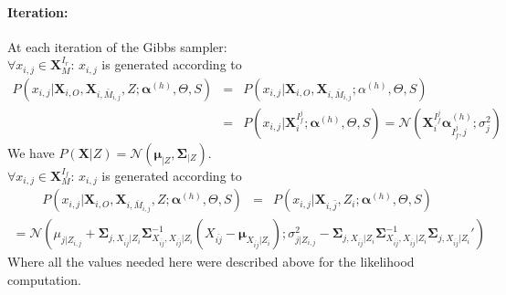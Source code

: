 \documentclass[12pt,a4paper]{report}
\begin{document}
		\paragraph{Iteration:} At each iteration of the Gibbs sampler: \\
			$\forall x_{i,j} \in \boldsymbol{X}_M^{I_r}$:  $x_{i,j}$ is generated according to 
			\begin{eqnarray}
			P(x_{i,j}|\boldsymbol{X}_{i,O},\boldsymbol{X}_{i,\bar{M}_{i,j}},Z;\boldsymbol{\alpha}^{(h)},\Theta,S)&=&P(x_{i,j}|\boldsymbol{X}_{i,O},\boldsymbol{X}_{i,\bar{M}_{i,j}};\alpha^{(h)},\Theta,S) \\
			&=&P(x_{i,j}|\boldsymbol{X}_i^{I_f^j};\boldsymbol{\alpha}^{(h)},\Theta,S)=\mathcal{N}(\boldsymbol{X}_i^{I_f^j}\boldsymbol{\alpha}^{(h)}_{I_f^j,j};\sigma_j^2 )
			\end{eqnarray}		
			We have $P(\boldsymbol{X}|Z)=\mathcal{N}(\boldsymbol{\mu}_{|Z},\boldsymbol{\Sigma}_{|Z})$. \\
			$\forall x_{i,j} \in \boldsymbol{X}_M^{I_f}$:  $x_{i,j}$ is generated according to 
			\begin{eqnarray}
			P(x_{i,j}|\boldsymbol{X}_{i,O},\boldsymbol{X}_{i,\bar{M}_{i,j}},Z;\boldsymbol{\alpha}^{(h)},\Theta,S)&=&P(x_{i,j}|\boldsymbol{X}_{i,\bar{j}},Z_i;\boldsymbol{\alpha}^{(h)},\Theta,S)			
			\end{eqnarray}			
			\begin{eqnarray}
			=\mathcal{N}(\mu_{j|Z_{i,j}} + \boldsymbol{\Sigma}_{j,X_{\bar{ij}}|Z_i}\boldsymbol{\Sigma}^{-1}_{X_{\bar{ij}},X_{\bar{ij}}|Z_i}(X_{\bar{ij}}-\boldsymbol{\mu}_{X_{\bar{ij}}|Z_i}) ;  \sigma_{j|Z_{i,j}}^2-\boldsymbol{\Sigma}_{j,X_{\bar{ij}}|Z_i}\boldsymbol{\Sigma}^{-1}_{X_{\bar{ij}},X_{\bar{ij}}|Z_i}\boldsymbol{\Sigma}_{j,X_{\bar{ij}}|Z_i}')
			\end{eqnarray}		
			Where all the values needed here were described above for the likelihood computation.
\end{document}
